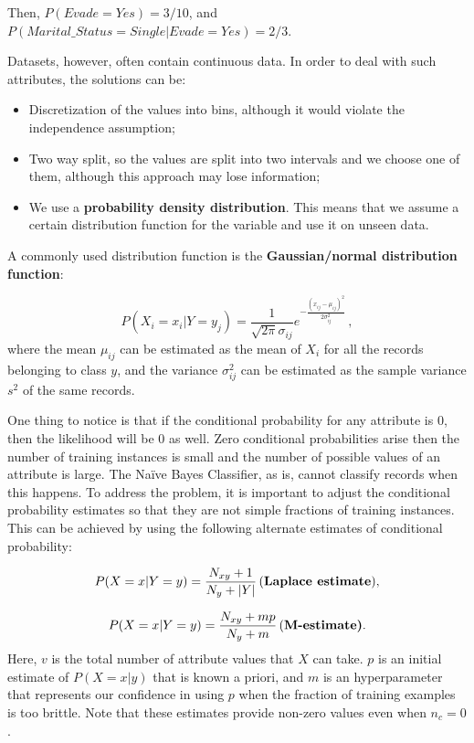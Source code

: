 Then, $P(\textit{Evade} = \textit{Yes}) = 3/10$, and $P(\textit{Marital\_Status} = \textit{Single} | \textit{Evade} = \textit{Yes}) = 2/3$.

Datasets, however, often contain continuous data. In order to deal with such attributes, the solutions can be:
\begin{itemize}
    \item Discretization of the values into bins, although it would violate the independence assumption;
    \item Two way split, so the values are split into two intervals and we choose one of them, although this approach may lose information;
    \item We use a \textbf{probability density distribution}. This means that we assume a certain distribution function for the variable and use it on unseen data.
\end{itemize}

A commonly used distribution function is the \textbf{Gaussian/normal distribution function}:

\begin{equation*}
    P(X_i = x_i | Y = y_j) = \dfrac{1}{\sqrt{2 \pi} \sigma_{ij}} e^{-\frac{(x_{ij} - \mu_{ij})^2}{2 \sigma_{ij}^2}} \, ,
\end{equation*}
where the mean $\mu_{ij}$ can be estimated as the mean of $X_i$ for all the records belonging to class $y$, and the variance $\sigma_{ij}^2$ can be estimated as the sample variance $s^2$ of the same records.

One thing to notice is that if the conditional probability for any attribute is 0, then the likelihood will be 0 as well. Zero conditional probabilities arise then the number of training instances is small and the number of possible values of an attribute is large. The Naïve Bayes Classifier, as is, cannot classify records when this happens. To address the problem, it is important to adjust the conditional probability estimates so that they are not simple fractions of training instances. This can be achieved by using the following alternate estimates of conditional probability:

\begin{equation*}
    P(X = x| Y = y) = \dfrac{N_{xy} + 1}{N_y + |Y|} \, \text{(\textbf{Laplace estimate})},
\end{equation*}

\begin{equation*}
    P(X = x| Y = y) = \dfrac{N_{xy} + mp}{N_y + m} \, \text{(\textbf{M-estimate)}}.
\end{equation*}
Here, $v$ is the total number of attribute values that $X$ can take. $p$ is an initial estimate of $P(X = x | y)$ that is known a priori, and $m$ is an hyperparameter that represents our confidence in using $p$ when the fraction of training examples is too brittle. Note that these estimates provide non-zero values even when $n_c = 0$.

